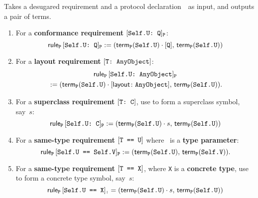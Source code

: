 \documentclass[../generics]{subfiles}
\begin{document}
\begin{algorithm}\label{build rule protocol}
Takes a desugared requirement and a protocol declaration~\tP\ as input, and outputs a pair of terms.
\begin{enumerate}
\item For a \textbf{conformance requirement} $[\texttt{Self.U:~Q}]_{\texttt{P}}$:
\[\mathsf{rule}_{\texttt{P}}\, [\texttt{Self.U:~Q}]_{\texttt{P}} := (\mathsf{term}_{\texttt{P}}(\texttt{Self.U})\cdot[\texttt{Q}],\,\mathsf{term}_{\texttt{P}}(\texttt{Self.U}))\]
\item For a \textbf{layout requirement} $[\texttt{T:~AnyObject}]$:
\begin{multline*}
\RuleP{P}\, \AssocConfReq{Self.U}{AnyObject}{P}\\
{} := (\TermP{P}(\texttt{Self.U})\cdot\layoutsym{AnyObject},$ $\TermP{P}(\texttt{Self.U})).
\end{multline*}
\item For a \textbf{superclass requirement} $[\texttt{T:~C}]$, use  to form a superclass symbol, say~$s$:
\[\mathsf{rule}_{\texttt{P}}\, [\texttt{Self.U:~C}]_{\texttt{P}} := (\mathsf{term}_{\texttt{P}}(\texttt{Self.U})\cdot s,\,\mathsf{term}_{\texttt{P}}(\texttt{Self.U}))\]
\item For a \textbf{same-type requirement} $[\texttt{T == U}]$ where \tU\ is a \textbf{type parameter}:
\[\mathsf{rule}_{\texttt{P}}\, [\texttt{Self.U == Self.V}]_{\texttt{P}} := (\mathsf{term}_{\texttt{P}}(\texttt{Self.U}),\,\mathsf{term}_{\texttt{P}}(\texttt{Self.V})).\]
\item For a \textbf{same-type requirement} $[\texttt{T == X}]$, where \texttt{X} is a \textbf{concrete type}, use  to form a concrete type symbol, say~$s$:
\[\mathsf{rule}_{\texttt{P}}\, [\texttt{Self.U == X}]_{\texttt{:}}= (\mathsf{term}_{\texttt{P}}(\texttt{Self.U})\cdot s,\,\mathsf{term}_{\texttt{P}}(\texttt{Self.U}))\]
\end{enumerate}
\end{algorithm}


\end{document}
